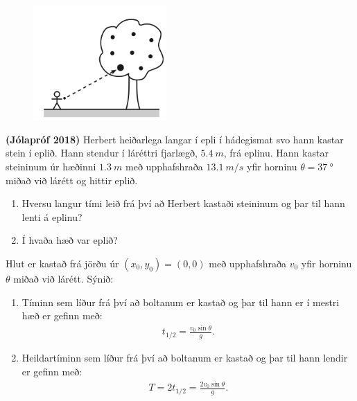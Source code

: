 \begin{enumerate}[label = \textbf{Dæmi \thechapter.\arabic*.}]
\begin{minipage}{\linewidth}
\end{minipage}


\begin{minipage}{\linewidth}
\begin{figure}
\vspace{-1.5cm}
\includegraphics[width=2in]{images/epli.png}
\end{figure}

\item \textbf{(Jólapróf 2018)} Herbert heiðarlega langar í epli í hádegismat svo hann kastar stein í eplið. Hann stendur í láréttri fjarlægð, $\SI{5,4}{m}$, frá eplinu. Hann kastar steininum úr hæðinni $\SI{1,3}{m}$ með upphafshraða $\SI{13,1}{m/s}$  yfir horninu $\theta = \SI{37}{\degree}$ miðað við lárétt og hittir eplið.

\begin{enumerate}[label = \textbf{(\alph*)}]
\item Hversu langur tími leið frá því að Herbert kastaði steininum og þar til hann lenti á eplinu?
\item Í hvaða hæð var eplið?
\end{enumerate}

\end{minipage}

\item Hlut er kastað frá jörðu úr $(x_0, y_0) = (0,0)$ með upphafshraða $v_0$ yfir horninu $\theta$ miðað við lárétt. Sýnið:
\begin{enumerate}[label = \textbf{(\alph*)}]
    \item Tíminn sem líður frá því að boltanum er kastað og þar til hann er í mestri hæð er gefinn með:
    \begin{align*}
        t_{1/2} = \frac{v_0 \sin\theta}{g}.
    \end{align*}
    \item Heildartíminn sem líður frá því að boltanum er kastað og þar til hann lendir er gefinn með:
    \begin{align*}
        T = 2t_{1/2} = \frac{2v_0 \sin\theta}{g}.
    \end{align*}
    

\end{enumerate}
\end{enumerate}
